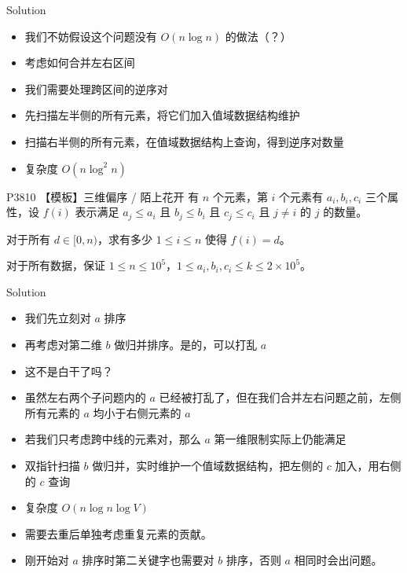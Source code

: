 ﻿\documentclass[aspectratio=169,handout]{ctexbeamer}
\begin{document}
\begin{frame}{Solution}
    \begin{itemize}
        \item 我们不妨假设这个问题没有 $O(n\log n)$ 的做法（？）
        \item 考虑如何合并左右区间
        \item 我们需要处理跨区间的逆序对
        \item 先扫描左半侧的所有元素，将它们加入值域数据结构维护
        \item 扫描右半侧的所有元素，在值域数据结构上查询，得到逆序对数量
        \item 复杂度 $O(n\log^2 n)$
    \end{itemize}
\end{frame}








\begin{frame}{P3810 【模板】三维偏序 / 陌上花开}
    有 $ n $ 个元素，第 $ i $ 个元素有 $ a_i,b_i,c_i $ 三个属性，设 $ f(i) $ 表示满足 $ a_j \leq a_i $ 且 $ b_j \leq b_i $ 且 $ c_j \leq c_i $ 且 $ j \ne i $ 的 $j$ 的数量。

    对于所有 $ d \in [0, n) $，求有多少 $1\le i\le n$ 使得 $ f(i) = d $。

    对于所有数据，保证 $ 1 \leq n \leq 10^5$，$1 \leq a_i, b_i, c_i \le k \leq 2 \times 10^5 $。
\end{frame}

\begin{frame}{Solution}
    \begin{itemize}
        \item 我们先立刻对 $a$ 排序
        \item 再考虑对第二维 $b$ 做归并排序。是的，可以打乱 $a$
        \item 这不是白干了吗？
        \item 虽然左右两个子问题内的 $a$ 已经被打乱了，但在我们合并左右问题之前，左侧所有元素的 $a$ 均小于右侧元素的 $a$
        \item 若我们只考虑跨中线的元素对，那么 $a$ 第一维限制实际上仍能满足
        \item 双指针扫描 $b$ 做归并，实时维护一个值域数据结构，把左侧的 $c$ 加入，用右侧的 $c$ 查询
        \item 复杂度 $O(n\log n\log V)$
        \item 需要去重后单独考虑重复元素的贡献。
        \item 刚开始对 $a$ 排序时第二关键字也需要对 $b$ 排序，否则 $a$ 相同时会出问题。
    \end{itemize}
\end{frame}
\end{document}
